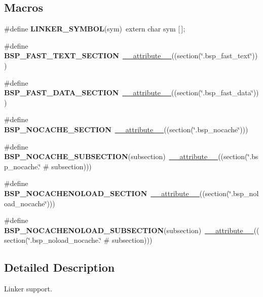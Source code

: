 \subsection*{Macros}
\begin{DoxyCompactItemize}
\item 
\mbox{\label{group__arm__linker_ga43e37a99d3603a193f318c1a2bb2edd9}} 
\#define {\bfseries L\+I\+N\+K\+E\+R\+\_\+\+S\+Y\+M\+B\+OL}(sym)~extern char sym \mbox{[}$\,$\mbox{]};
\item 
\mbox{\label{group__arm__linker_gabe1e835c1eec56e262fa720a87dad647}} 
\#define {\bfseries B\+S\+P\+\_\+\+F\+A\+S\+T\+\_\+\+T\+E\+X\+T\+\_\+\+S\+E\+C\+T\+I\+ON}~\mbox{\hyperlink{struct____attribute____}{\+\_\+\+\_\+attribute\+\_\+\+\_\+}}((section(\char`\"{}.bsp\+\_\+fast\+\_\+text\char`\"{})))
\item 
\mbox{\label{group__arm__linker_ga92c8020c243774f015eb1c0358aba4da}} 
\#define {\bfseries B\+S\+P\+\_\+\+F\+A\+S\+T\+\_\+\+D\+A\+T\+A\+\_\+\+S\+E\+C\+T\+I\+ON}~\mbox{\hyperlink{struct____attribute____}{\+\_\+\+\_\+attribute\+\_\+\+\_\+}}((section(\char`\"{}.bsp\+\_\+fast\+\_\+data\char`\"{})))
\item 
\mbox{\label{group__arm__linker_ga3ad09e2d6988d8d57b1b9eab52142ca0}} 
\#define {\bfseries B\+S\+P\+\_\+\+N\+O\+C\+A\+C\+H\+E\+\_\+\+S\+E\+C\+T\+I\+ON}~\mbox{\hyperlink{struct____attribute____}{\+\_\+\+\_\+attribute\+\_\+\+\_\+}}((section(\char`\"{}.bsp\+\_\+nocache\char`\"{})))
\item 
\mbox{\label{group__arm__linker_ga5680db208604be018d602d9824cdd557}} 
\#define {\bfseries B\+S\+P\+\_\+\+N\+O\+C\+A\+C\+H\+E\+\_\+\+S\+U\+B\+S\+E\+C\+T\+I\+ON}(subsection)~\mbox{\hyperlink{struct____attribute____}{\+\_\+\+\_\+attribute\+\_\+\+\_\+}}((section(\char`\"{}.bsp\+\_\+nocache.\char`\"{} \# subsection)))
\item 
\mbox{\label{group__arm__linker_ga672d57deb2514abc3c35a443e4a06956}} 
\#define {\bfseries B\+S\+P\+\_\+\+N\+O\+C\+A\+C\+H\+E\+N\+O\+L\+O\+A\+D\+\_\+\+S\+E\+C\+T\+I\+ON}~\mbox{\hyperlink{struct____attribute____}{\+\_\+\+\_\+attribute\+\_\+\+\_\+}}((section(\char`\"{}.bsp\+\_\+noload\+\_\+nocache\char`\"{})))
\item 
\mbox{\label{group__arm__linker_gae12ac7f431e92a71e8e86af80e873150}} 
\#define {\bfseries B\+S\+P\+\_\+\+N\+O\+C\+A\+C\+H\+E\+N\+O\+L\+O\+A\+D\+\_\+\+S\+U\+B\+S\+E\+C\+T\+I\+ON}(subsection)~\mbox{\hyperlink{struct____attribute____}{\+\_\+\+\_\+attribute\+\_\+\+\_\+}}((section(\char`\"{}.bsp\+\_\+noload\+\_\+nocache.\char`\"{} \# subsection)))
\end{DoxyCompactItemize}


\subsection{Detailed Description}
Linker support. 

